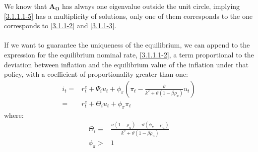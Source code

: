 \documentclass{article}
\numberwithin{equation}{section}
\begin{document}
We know that $\boldsymbol{A_O}$ has always one eigenvalue outside the unit circle, implying \eqref{3.1.1.1-5} has a multiplicity of solutions, only one of them corresponds to the one corresponds to \eqref{3.1.1-2} and \eqref{3.1.1-3}.\\\\
If we want to guarantee the uniqueness of the equilibrium, we can append to the expression for the equilibrium nominal rate, \eqref{3.1.1.1-2}, a term proportional to the deviation between inflation and the equilibrium value of the inflation under that policy, with a coefficient of proportionality greater than one:
	\begin{align}
		i_t = &r^e_t + \Psi_i u_t + \phi_\pi \left( \pi_t - \frac{\vartheta}{k^2 + \vartheta(1 - \beta\rho_u)}u_t \right) \nonumber\\
		= &r^e_t + \Theta_i u_t + \phi_\pi \pi_t
	\end{align}
where:
	\begin{align*}
		\Theta_i \equiv &\frac{\sigma(1 - \rho_u) - \vartheta(\phi_\pi - \rho_u)}{k^2 + \vartheta(1 - \beta\rho_u)}\\
		\phi_\pi > &1
	\end{align*}
\end{document}
